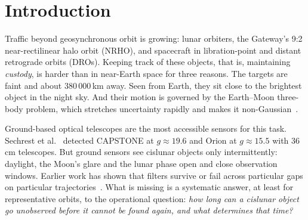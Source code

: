 \documentclass[pdflatex,sn-mathphys-num]{sn-jnl}
\begin{document}
\section{Introduction}\label{sec:intro}

Traffic beyond geosynchronous orbit is growing: lunar orbiters, the Gateway's 9:2
near-rectilinear halo orbit (NRHO), and spacecraft in libration-point and distant retrograde
orbits (DROs). Keeping track of these objects, that is, maintaining \emph{custody}, is harder than
in near-Earth space for three reasons. The targets are faint and about 380\,000\,km away. Seen from
Earth, they sit close to the brightest object in the night sky. And their motion is governed by
the Earth--Moon three-body problem, which stretches uncertainty rapidly and makes it
non-Gaussian~\cite{frueh2021,holzinger2021primer,baker2024}.

Ground-based optical telescopes are the most accessible sensors for this task.
Sechrest et al.~\cite{sechrest2024} detected CAPSTONE at $g \approx 19.6$ and Orion at
$g \approx 15.5$ with 36\,cm telescopes. But ground sensors see cislunar objects only
intermittently: daylight, the Moon's glare and the lunar phase open and close observation windows.
Earlier work has shown that filters survive or fail across particular gaps on particular
trajectories~\cite{chow2021,chow2022,iannamorelli2023}. What is missing is a systematic answer, at least for representative orbits, to
the operational question: \emph{how long can a cislunar object go unobserved before it cannot be found
again, and what determines that time?}
\end{document}
